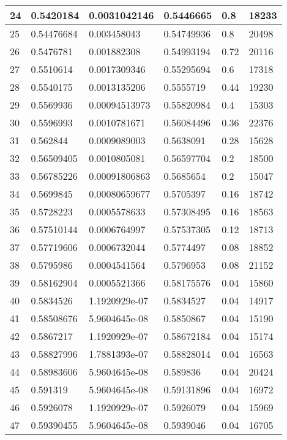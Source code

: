 \begin{longtable}{|l|l|l|l|l|l|}
24 & 0.5420184 & 0.0031042146 & 0.5446665 & 0.8 & 18233 \\ \hline 
25 & 0.54476684 & 0.003458043 & 0.54749936 & 0.8 & 20498 \\ \hline 
26 & 0.5476781 & 0.001882308 & 0.54993194 & 0.72 & 20116 \\ \hline 
27 & 0.5510614 & 0.0017309346 & 0.55295694 & 0.6 & 17318 \\ \hline 
28 & 0.5540175 & 0.0013135206 & 0.5555719 & 0.44 & 19230 \\ \hline 
29 & 0.5569936 & 0.00094513973 & 0.55820984 & 0.4 & 15303 \\ \hline 
30 & 0.5596993 & 0.0010781671 & 0.56084496 & 0.36 & 22376 \\ \hline 
31 & 0.562844 & 0.0009089003 & 0.5638091 & 0.28 & 15628 \\ \hline 
32 & 0.56509405 & 0.0010805081 & 0.56597704 & 0.2 & 18500 \\ \hline 
33 & 0.56785226 & 0.00091806863 & 0.5685654 & 0.2 & 15047 \\ \hline 
34 & 0.5699845 & 0.00080659677 & 0.5705397 & 0.16 & 18742 \\ \hline 
35 & 0.5728223 & 0.0005578633 & 0.57308495 & 0.16 & 18563 \\ \hline 
36 & 0.57510144 & 0.0006764997 & 0.57537305 & 0.12 & 18713 \\ \hline 
37 & 0.57719606 & 0.0006732044 & 0.5774497 & 0.08 & 18852 \\ \hline 
38 & 0.5795986 & 0.0004541564 & 0.5796953 & 0.08 & 21152 \\ \hline 
39 & 0.58162904 & 0.0005521366 & 0.58175576 & 0.04 & 15860 \\ \hline 
40 & 0.5834526 & 1.1920929e-07 & 0.5834527 & 0.04 & 14917 \\ \hline 
41 & 0.58508676 & 5.9604645e-08 & 0.5850867 & 0.04 & 15190 \\ \hline 
42 & 0.5867217 & 1.1920929e-07 & 0.58672184 & 0.04 & 15174 \\ \hline 
43 & 0.58827996 & 1.7881393e-07 & 0.58828014 & 0.04 & 16563 \\ \hline 
44 & 0.58983606 & 5.9604645e-08 & 0.589836 & 0.04 & 20424 \\ \hline 
45 & 0.591319 & 5.9604645e-08 & 0.59131896 & 0.04 & 16972 \\ \hline 
46 & 0.5926078 & 1.1920929e-07 & 0.5926079 & 0.04 & 15969 \\ \hline 
47 & 0.59390455 & 5.9604645e-08 & 0.5939046 & 0.04 & 16705 \\ \hline 

\end{longtable}
